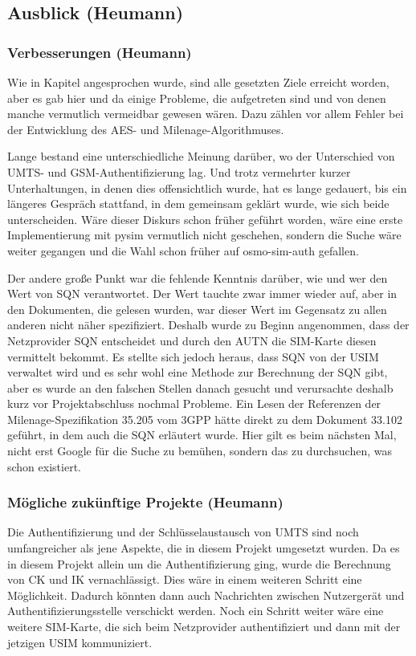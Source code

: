	\subsection{Ausblick (Heumann)}
		\subsubsection{Verbesserungen (Heumann)}
		Wie in Kapitel  angesprochen wurde, sind alle gesetzten
		Ziele erreicht worden, aber es gab hier und da einige Probleme, die aufgetreten
		sind und von denen manche vermutlich vermeidbar gewesen wären. Dazu zählen vor
		allem Fehler bei der Entwicklung des AES- und Milenage-Algorithmuses.
		
		Lange bestand eine unterschiedliche Meinung darüber, wo der Unterschied von UMTS-
		und GSM-Authentifizierung lag. Und trotz vermehrter kurzer Unterhaltungen, in
		denen dies offensichtlich wurde, hat es lange gedauert, bis ein längeres Gespräch
		stattfand, in dem gemeinsam geklärt wurde, wie sich beide unterscheiden. Wäre
		dieser Diskurs schon früher geführt worden, wäre eine erste Implementierung mit
		pysim vermutlich nicht geschehen, sondern die Suche wäre weiter gegangen und
		die Wahl schon früher auf osmo-sim-auth gefallen.
		
		Der andere große Punkt war die fehlende Kenntnis darüber, wie und wer den Wert von SQN
		verantwortet. Der Wert tauchte zwar immer wieder auf, aber in den Dokumenten,
		die gelesen wurden, war dieser Wert im Gegensatz zu allen anderen nicht näher
		spezifiziert. Deshalb wurde zu Beginn angenommen, dass der Netzprovider SQN
		entscheidet und durch den AUTN die SIM-Karte diesen vermittelt bekommt. Es
		stellte sich jedoch heraus, dass SQN von der USIM verwaltet wird und es sehr wohl
		eine Methode zur Berechnung der SQN gibt, aber es wurde an den falschen Stellen
		danach gesucht und verursachte deshalb kurz vor Projektabschluss nochmal Probleme.
		Ein Lesen der Referenzen der Milenage-Spezifikation 35.205 vom 3GPP hätte direkt
		zu dem Dokument 33.102 geführt, in dem auch die SQN erläutert wurde. Hier gilt
		es beim nächsten Mal, nicht erst Google für die Suche zu bemühen, sondern das zu
		durchsuchen, was schon existiert.
		
		\subsubsection{Mögliche zukünftige Projekte (Heumann)}
		Die Authentifizierung und der Schlüsselaustausch von UMTS sind noch umfangreicher
		als jene Aspekte, die in diesem Projekt umgesetzt wurden. Da es in diesem Projekt allein um die
		Authentifizierung ging, wurde die Berechnung von CK und IK vernachlässigt. Dies
		wäre in einem weiteren Schritt eine Möglichkeit. Dadurch könnten dann auch
		Nachrichten zwischen Nutzergerät und Authentifizierungsstelle verschickt werden.
		Noch ein Schritt weiter wäre eine weitere SIM-Karte, die sich beim
		Netzprovider authentifiziert und dann mit der jetzigen USIM kommuniziert.

